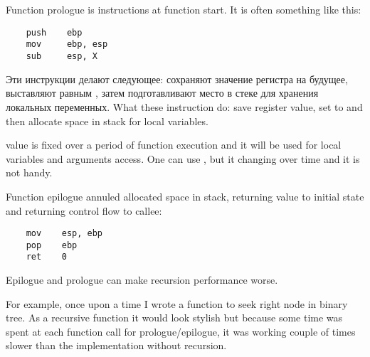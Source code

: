 ﻿%

\section{}
\label{sec:prologepilog}

{Function prologue is instructions at function start. It is often something like this:}

\begin{lstlisting}
    push    ebp
    mov     ebp, esp
    sub     esp, X
\end{lstlisting}

\IFRU
{Эти инструкции делают следующее: сохраняют значение регистра \EBP на будущее, выставляют \EBP равным \ESP, 
затем подготавливают место в стеке для хранения локальных переменных.}
{What these instruction do: save \EBP register value, set \EBP to \ESP and then allocate space in stack 
for local variables.}

{\EBP value is fixed over a period of function execution and it will be used for local variables and 
arguments access. 
One can use \ESP, but it changing over time and it is not handy.}

{Function epilogue annuled allocated space in stack, returning \EBP value to initial state 
and returning control flow to callee:}

\begin{lstlisting}
    mov    esp, ebp
    pop    ebp
    ret    0
\end{lstlisting}

{Epilogue and prologue can make recursion performance worse.

For example, once upon a time I wrote a function to seek right node in binary tree. 
As a recursive function it would look stylish but because some time was spent at each function call
for prologue/epilogue, it was working couple of times slower than the implementation 
without recursion.}

